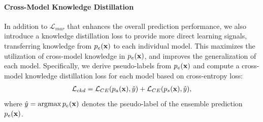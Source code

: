 \vspace{-10pt}\paragraph{Cross-Model Knowledge Distillation}
In addition to $\mathcal{L}_{mar}$ that enhances the overall prediction performance, we also introduce a knowledge distillation loss to provide more direct learning signals, transferring knowledge from $p_{e}(\mathbf{x})$ to each individual model. This maximizes the utilization of cross-model knowledge in $p_e(\mathbf{x})$, and improves the generalization of each model. Specifically, we derive pseudo-labels from $p_e(\mathbf{x})$ and compute a cross-model knowledge distillation loss for each model based on cross-entropy loss: 
\begin{align}
\label{ckdloss}
\mathcal{L}_{ckd} = \mathcal{L}_{CE}(p_a(\mathbf{x}),\hat{y}) + \mathcal{L}_{CE}(p_s(\mathbf{x}),\hat{y}),
\end{align}
where $\hat{y}= \operatorname*{argmax} p_e(\mathbf{x})$ denotes the pseudo-label of the ensemble prediction $p_e(\mathbf{x})$.






